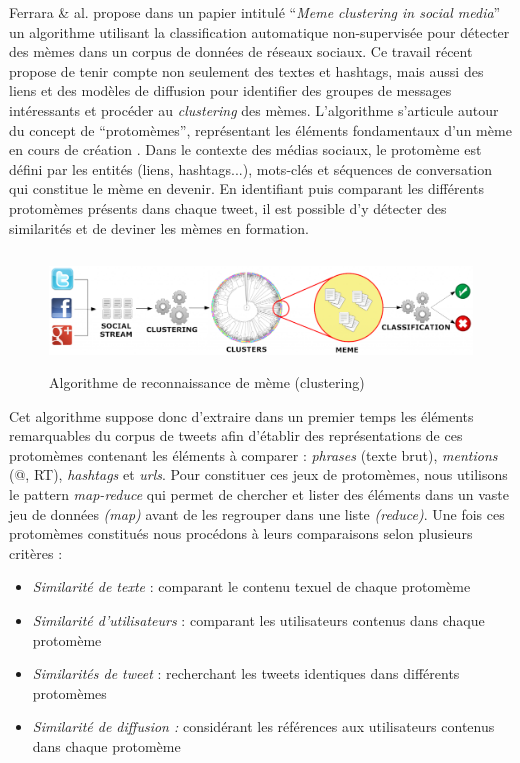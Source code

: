 Ferrara \& al. \citep{Ferrara2013} propose dans un papier intitulé {\textquotedblleft}\textit{Meme clustering in social media}{\textquotedblright} un algorithme utilisant la classification automatique non-supervisée pour détecter des mèmes dans un corpus de données de réseaux sociaux. Ce travail récent propose de tenir compte non seulement des textes et hashtags, mais aussi des liens et des modèles de diffusion pour identifier des groupes de messages intéressants et procéder au \textit{clustering }des mèmes. L{\textquoteright}algorithme s{\textquoteright}articule autour du concept de {\textquotedblleft}protomèmes{\textquotedblright}, représentant les éléments fondamentaux d{\textquoteright}un mème en cours de création \citep{Gabora1995}. Dans le contexte des médias sociaux, le protomème est défini par les entités (liens, hashtags...), mots-clés et séquences de conversation qui constitue le mème en devenir. En identifiant puis comparant les différents protomèmes présents dans chaque tweet, il est possible d{\textquoteright}y détecter des similarités et de deviner les mèmes en formation.  

\begin{figure} 
    \centering
    \includegraphics[width=5.8894in,height=1.2114in]{figures/chap3/chapitre3-img6.png}
    \caption{Algorithme de reconnaissance de mème (clustering) \citep{Ferrara2013}}
\end{figure}

Cet algorithme suppose donc d{\textquoteright}extraire dans un premier temps les éléments remarquables du corpus de tweets afin d{\textquoteright}établir des représentations de ces protomèmes contenant les éléments à comparer : \textit{phrases} (texte brut), \textit{mentions }(@, RT), \textit{hashtags }et \textit{urls}. Pour constituer ces jeux de protomèmes, nous utilisons le pattern \textit{map-reduce} qui permet de chercher et lister des éléments dans un vaste jeu de données \textit{(map)} avant de les regrouper dans une liste \textit{(reduce)}. Une fois ces protomèmes constitués nous procédons à leurs comparaisons selon plusieurs critères :

\begin{itemize}
\item \textit{Similarité de texte }: comparant le contenu texuel de chaque protomème 
\item \textit{Similarité d{\textquoteright}utilisateurs} : comparant les utilisateurs contenus dans chaque protomème
\item \textit{Similarités de tweet }: recherchant les tweets identiques dans différents protomèmes
\item \textit{Similarité de diffusion : }considérant les références aux utilisateurs contenus dans chaque protomème
\end{itemize}

